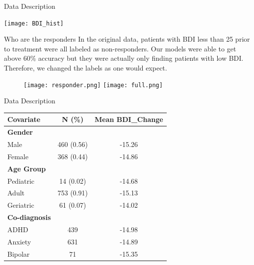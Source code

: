 \documentclass{beamer}
\begin{document}
\begin{frame}{Data Description}
\begin{center}
\texttt{[image: BDI\_hist]}
\end{center}
\end{frame}

\begin{frame}{Who are the responders}
In the original data, patients with BDI less than 25 prior to treatment were all labeled as non-responders. Our models were able to get above $60\%$ accuracy but they were actually only finding patients with low BDI. Therefore, we changed the labels as one would expect.
\begin{figure}[H]
\texttt{[image: responder.png]}
\texttt{[image: full.png]}
\end{figure}
\end{frame}

\begin{frame}{Data Description}
\centering
\begin{table}
\begin{tabular}{lcc}
\hline
\textbf{Covariate}& \textbf{N (\%)} & \textbf{Mean BDI\_Change }\\\hline\hline
\textbf{Gender }& & \\
\hspace{0.1in} Male & 460 (0.56) & -15.26\\
\hspace{0.1in} Female & 368 (0.44) & -14.86\\
\textbf{Age Group }& & \\
\hspace{0.1in} Pediatric & 14 (0.02) & -14.68\\
\hspace{0.1in} Adult & 753 (0.91) & -15.13\\
\hspace{0.1in} Geriatric & 61 (0.07) & -14.02\\
\textbf{Co-diagnosis}& & \\
\hspace{0.1in} ADHD & 439 & -14.98\\
\hspace{0.1in} Anxiety & 631 & -14.89\\
\hspace{0.1in} Bipolar & 71 & -15.35\\
\hline
\end{tabular}
\end{table}
\end{frame}
\end{document}
